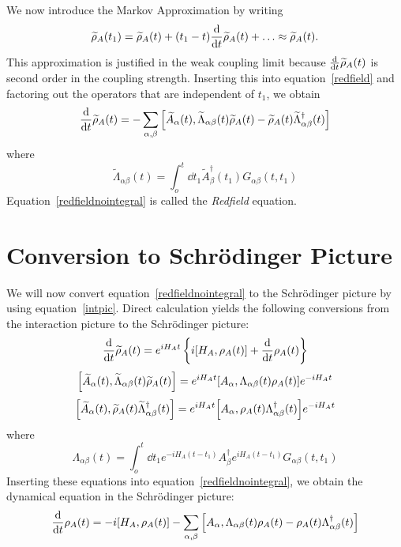 \documentclass{article}
\newcommand{\til}[1]{\widetilde{#1}}
\begin{document}
We now introduce the Markov Approximation by writing
\begin{equation}\label{markov}
\til{\rho}_A(t_1) = \til{\rho}_A(t) + (t_1-t)\dv{t}\til{\rho}_A(t)+\ldots \approx \til{\rho}_A(t).
\end{equation}
This approximation is justified in the weak coupling limit because $\dv{t}\til{\rho}_A(t)$ is second order in the coupling strength. Inserting this into equation~\ref{redfield} and factoring out the operators that are independent of $t_1$, we obtain
\begin{equation}\label{redfieldnointegral}
\dv{t}\til{\rho}_A(t) = -\sum_{\alpha,\beta}\comm{\til{A}_{\alpha}(t)}{\til{\Lambda}_{\alpha\beta}(t)\til{\rho}_A(t) - \til{\rho}_A(t)\til{\Lambda}_{\alpha\beta}^{\dag}(t)}
\end{equation}
where
\begin{equation}\label{Lambdaint}
\til{\Lambda}_{\alpha\beta}(t) = \int_o^t\dd{t_1} \til{A}_{\beta}^{\dag}(t_1)G_{\alpha\beta}(t,t_1)
\end{equation}
Equation~\ref{redfieldnointegral} is called the \textit{Redfield} equation.

\section{Conversion to Schr{\"o}dinger Picture}

We will now convert equation~\ref{redfieldnointegral} to the Schr{\"o}dinger picture by using equation~\ref{intpic}. Direct calculation yields the following conversions from the interaction picture to the Schr{\"o}dinger picture:
\begin{equation}\label{p1}
\dv{t}\til{\rho}_A(t) = e^{iH_At}\left\{i\comm{H_A}{\rho_A(t)}+\dv{t}\rho_A(t)\right\}
\end{equation}
\begin{equation}\label{p2}
\comm{\til{A}_{\alpha}(t)}{\til{\Lambda}_{\alpha\beta}(t)\til{\rho}_A(t)} = e^{iH_At}\comm{A_{\alpha}}{\Lambda_{\alpha\beta}(t)\rho_A(t)}e^{-iH_At}
\end{equation}
\begin{equation}\label{p3}
\comm{\til{A}_{\alpha}(t)}{\til{\rho}_A(t)\til{\Lambda}_{\alpha\beta}^{\dag}(t)} = e^{iH_At}\comm{A_{\alpha}}{\rho_A(t)\Lambda_{\alpha\beta}^{\dag}(t)}e^{-iH_At}
\end{equation}
where
\begin{equation}\label{Lambdasch}
\Lambda_{\alpha\beta}(t) = \int_o^t\dd{t_1} e^{-iH_A(t-t_1)}A_{\beta}^{\dag}e^{iH_A(t-t_1)}G_{\alpha\beta}(t,t_1)
\end{equation}
Inserting these equations into equation~\ref{redfieldnointegral}, we obtain the dynamical equation in the Schr{\"o}dinger picture:
\begin{equation}\label{yas}
\dv{t}\rho_A(t) = -i\comm{H_A}{\rho_A(t)}-\sum_{\alpha,\beta}\comm{A_{\alpha}}{\Lambda_{\alpha\beta}(t)\rho_A(t)-\rho_A(t)\Lambda_{\alpha\beta}^{\dag}(t)}
\end{equation}
\end{document}

